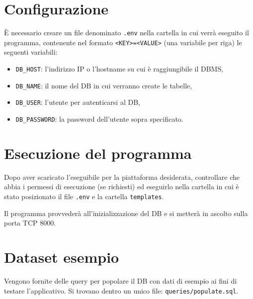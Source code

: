 \documentclass[a4paper,12pt]{report}
\begin{document}
	\section{Configurazione}
	\par \`E necessario creare un file denominato \texttt{.env} nella cartella in cui verrà eseguito il programma, contenente nel formato \texttt{<KEY>=<VALUE>} (una variabile per riga) le seguenti variabili:
	\begin{itemize}
		\item \texttt{DB\_HOST}: l'indirizzo IP o l'hostname su cui è raggiungibile il DBMS,
		\item \texttt{DB\_NAME}: il nome del DB in cui verranno create le tabelle,
		\item \texttt{DB\_USER}: l'utente per autenticarsi al DB,
		\item \texttt{DB\_PASSWORD}: la password dell'utente sopra specificato.
	\end{itemize}
	\section{Esecuzione del programma}
	\par Dopo aver scaricato l'eseguibile per la piattaforma desiderata, controllare che abbia i permessi di esecuzione (se richiesti) ed eseguirlo nella cartella in cui è stato posizionato il file \texttt{.env} e la cartella \texttt{templates}.
	\par Il programma provvederà all'inizializzazione del DB e si metterà in ascolto sulla porta TCP 8000.
	\section{Dataset esempio}
	\par Vengono fornite delle query per popolare il DB con dati di esempio ai fini di testare l'applicativo.
	Si trovano dentro un unico file: \texttt{queries/populate.sql}.
    \listoffigures
\end{document}
